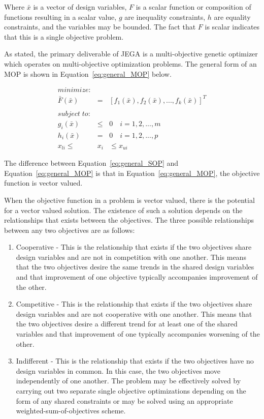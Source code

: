 Where $\bar{x}$ is a vector of design variables, $F$ is a scalar
function or composition of functions resulting in a scalar value,
$g$ are inequality constraints, $h$ are equality constraints, and
the variables may be bounded.  The fact that $F$ is scalar indicates
that this is a single objective problem.

As stated, the primary deliverable of JEGA is a multi-objective
genetic optimizer which operates on multi-objective optimization
problems.  The general form of an MOP is shown in
Equation~\ref{eq:general_MOP} below.

\begin{eqnarray} \label{eq:general_MOP}
\nonumber minimize: & & \\
\nonumber \bar{F}(\bar{x}) &=& [f_1(\bar{x}), f_2(\bar{x}), ..., f_k(\bar{x})]^T \\
\nonumber & & \\
\nonumber subject\; to: & & \\
          g_i(\bar{x}) &\leq & 0\quad i=1,2,...,m \\
\nonumber h_i(\bar{x}) &=& 0\quad i=1,2,...,p \\
\nonumber x_{li} \leq & x_i & \leq x_{ui}
\end{eqnarray}

The difference between Equation~\ref{eq:general_SOP} and
Equation~\ref{eq:general_MOP} is that in
Equation~\ref{eq:general_MOP}, the objective function is vector
valued.

When the objective function in a problem is vector valued, there is
the potential for a vector valued solution.  The existence of such a
solution depends on the relationships that exists between the
objectives. The three possible relationships between any two
objectives are as follows:

\begin{enumerate}
    \item Cooperative - This is the relationship that exists if the
    two objectives share design variables and are not in competition
    with one another.  This means that the two objectives desire the
    same trends in the shared design variables and that improvement
    of one objective typically accompanies improvement of the other.

    \item Competitive - This is the relationship that exists if the
    two objectives share design variables and are not cooperative
    with one another.  This means that the two objectives desire a
    different trend for at least one of the shared variables and
    that improvement of one typically accompanies worsening of the
    other.

    \item Indifferent - This is the relationship that exists if the
    two objectives have no design variables in common.  In this
    case, the two objectives move independently of one another.  The
    problem may be effectively solved by carrying out two separate
    single objective optimizations depending on the form of any shared
    constraints or may be solved using an appropriate
    weighted-sum-of-objectives scheme.
\end{enumerate}

